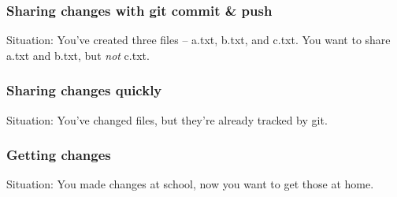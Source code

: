 \documentclass{beamer}
\begin{document}
\begin{frame}
\frametitle{Sharing changes with git commit \& push}
\alert{Situation:} You've created three files -- a.txt, b.txt, and c.txt. You
want to share a.txt and b.txt, but \emph{not} c.txt.

\vspace{.05\textwidth}


\vspace{.05\textwidth}

\begin{enumerate}
\end{enumerate}
\end{frame}

\begin{frame}
\frametitle{Sharing changes quickly}
\alert{Situation:} You've changed files, but they're already tracked by git.

\vspace{.05\textwidth}


\vspace{.05\textwidth}
\begin{enumerate}
\end{enumerate}
\end{frame}

\begin{frame}
\frametitle{Getting changes}
\alert{Situation:} You made changes at school, now you want to get those at
home.

\vspace{.05\textwidth}


\vspace{.05\textwidth}
\begin{enumerate}
\end{enumerate}
\end{frame}
\end{document}
